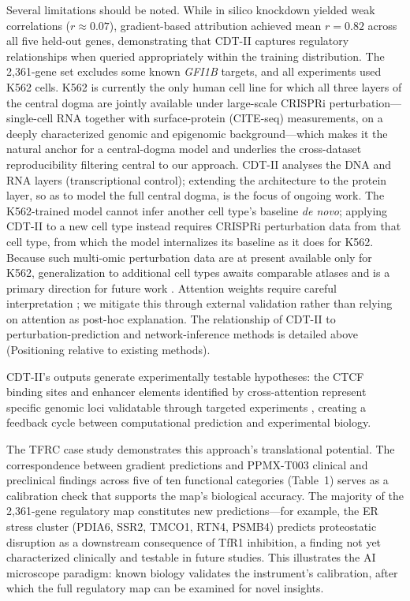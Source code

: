 \documentclass[12pt,a4paper]{article}
\begin{document}
Several limitations should be noted. While in silico knockdown yielded weak correlations ($r \approx 0.07$), gradient-based attribution achieved mean $r = 0.82$ across all five held-out genes, demonstrating that CDT-II captures regulatory relationships when queried appropriately within the training distribution. The 2,361-gene set excludes some known \textit{GFI1B} targets, and all experiments used K562 cells. K562 is currently the only human cell line for which all three layers of the central dogma are jointly available under large-scale CRISPRi perturbation---single-cell RNA together with surface-protein (CITE-seq) measurements, on a deeply characterized genomic and epigenomic background---which makes it the natural anchor for a central-dogma model and underlies the cross-dataset reproducibility filtering central to our approach. CDT-II analyses the DNA and RNA layers (transcriptional control); extending the architecture to the protein layer, so as to model the full central dogma, is the focus of ongoing work. The K562-trained model cannot infer another cell type's baseline \textit{de novo}; applying CDT-II to a new cell type instead requires CRISPRi perturbation data from that cell type, from which the model internalizes its baseline as it does for K562. Because such multi-omic perturbation data are at present available only for K562, generalization to additional cell types awaits comparable atlases and is a primary direction for future work \citep{shalem2014,replogle2022}. Attention weights require careful interpretation \citep{jain2019,wiegreffe2019}; we mitigate this through external validation rather than relying on attention as post-hoc explanation. The relationship of CDT-II to perturbation-prediction and network-inference methods is detailed above (Positioning relative to existing methods).

CDT-II's outputs generate experimentally testable hypotheses: the CTCF binding sites and enhancer elements identified by cross-attention represent specific genomic loci validatable through targeted experiments \citep{fulco2019}, creating a feedback cycle between computational prediction and experimental biology.

The TFRC case study demonstrates this approach's translational potential. The correspondence between gradient predictions and PPMX-T003 clinical and preclinical findings across five of ten functional categories (Table~1) serves as a calibration check that supports the map's biological accuracy. The majority of the 2,361-gene regulatory map constitutes new predictions---for example, the ER stress cluster (PDIA6, SSR2, TMCO1, RTN4, PSMB4) predicts proteostatic disruption as a downstream consequence of TfR1 inhibition, a finding not yet characterized clinically and testable in future studies. This illustrates the AI microscope paradigm: known biology validates the instrument's calibration, after which the full regulatory map can be examined for novel insights.
\end{document}
